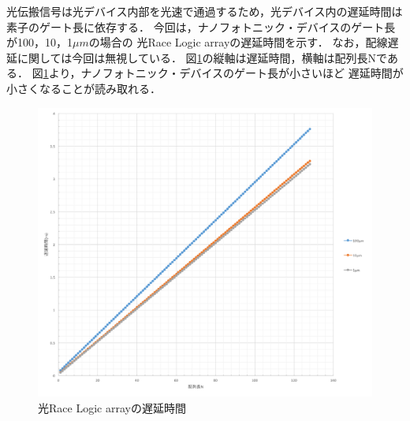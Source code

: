 光伝搬信号は光デバイス内部を光速で通過するため，光デバイス内の遅延時間は素子のゲート長に依存する．
今回は，ナノフォトニック・デバイスのゲート長が100，10，1$\mu m$の場合の
光Race Logic arrayの遅延時間を示す．
なお，配線遅延に関しては今回は無視している．
図\ref{fig:nanolatency}の縦軸は遅延時間，横軸は配列長Nである．
図\ref{fig:nanolatency}より，ナノフォトニック・デバイスのゲート長が小さいほど
遅延時間が小さくなることが読み取れる．
\begin{figure}[t!]
\begin{center}
\includegraphics[keepaspectratio,scale=0.5]{fig/4/nanolatency.png}
\caption{光Race Logic arrayの遅延時間}
\label{fig:nanolatency}
\end{center}
\end{figure}

